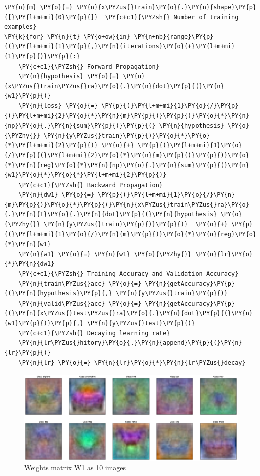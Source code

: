 \documentclass[a4paper,11pt]{article}%
\begin{document}
    \begin{tcolorbox}[breakable, size=fbox, boxrule=1pt, pad at break*=1mm,colback=cellbackground, colframe=cellborder]
\begin{Verbatim}[commandchars=\\\{\}]
\PY{n}{m} \PY{o}{=} \PY{n}{x\PYZus{}train}\PY{o}{.}\PY{n}{shape}\PY{p}{[}\PY{l+m+mi}{0}\PY{p}{]}  \PY{c+c1}{\PYZsh{} Number of training examples}
\PY{k}{for} \PY{n}{t} \PY{o+ow}{in} \PY{n+nb}{range}\PY{p}{(}\PY{l+m+mi}{1}\PY{p}{,}\PY{n}{iterations}\PY{o}{+}\PY{l+m+mi}{1}\PY{p}{)}\PY{p}{:}    
    \PY{c+c1}{\PYZsh{} Forward Propagation}
    \PY{n}{hypothesis} \PY{o}{=} \PY{n}{x\PYZus{}train\PYZus{}ra}\PY{o}{.}\PY{n}{dot}\PY{p}{(}\PY{n}{w1}\PY{p}{)}
    \PY{n}{loss} \PY{o}{=} \PY{p}{(}\PY{l+m+mi}{1}\PY{o}{/}\PY{p}{(}\PY{l+m+mi}{2}\PY{o}{*}\PY{n}{m}\PY{p}{)}\PY{p}{)}\PY{o}{*}\PY{n}{np}\PY{o}{.}\PY{n}{sum}\PY{p}{(}\PY{p}{(} \PY{n}{hypothesis} \PY{o}{\PYZhy{}} \PY{n}{y\PYZus{}train}\PY{p}{)}\PY{o}{*}\PY{o}{*}\PY{l+m+mi}{2}\PY{p}{)} \PY{o}{+} \PY{p}{(}\PY{l+m+mi}{1}\PY{o}{/}\PY{p}{(}\PY{l+m+mi}{2}\PY{o}{*}\PY{n}{m}\PY{p}{)}\PY{p}{)}\PY{o}{*}\PY{n}{reg}\PY{o}{*}\PY{n}{np}\PY{o}{.}\PY{n}{sum}\PY{p}{(}\PY{n}{w1}\PY{o}{*}\PY{o}{*}\PY{l+m+mi}{2}\PY{p}{)}   
    \PY{c+c1}{\PYZsh{} Backward Propagation}
    \PY{n}{dw1} \PY{o}{=} \PY{p}{(}\PY{l+m+mi}{1}\PY{o}{/}\PY{n}{m}\PY{p}{)}\PY{o}{*}\PY{p}{(}\PY{n}{x\PYZus{}train\PYZus{}ra}\PY{o}{.}\PY{n}{T}\PY{o}{.}\PY{n}{dot}\PY{p}{(}\PY{n}{hypothesis} \PY{o}{\PYZhy{}} \PY{n}{y\PYZus{}train}\PY{p}{)}\PY{p}{)}  \PY{o}{+} \PY{p}{(}\PY{l+m+mi}{1}\PY{o}{/}\PY{n}{m}\PY{p}{)}\PY{o}{*}\PY{n}{reg}\PY{o}{*}\PY{n}{w1} 
    \PY{n}{w1} \PY{o}{=} \PY{n}{w1} \PY{o}{\PYZhy{}} \PY{n}{lr}\PY{o}{*}\PY{n}{dw1}    
    \PY{c+c1}{\PYZsh{} Training Accuracy and Validation Accuracy}
    \PY{n}{train\PYZus{}acc} \PY{o}{=} \PY{n}{getAccuracy}\PY{p}{(}\PY{n}{hypothesis}\PY{p}{,} \PY{n}{y\PYZus{}train}\PY{p}{)}
    \PY{n}{valid\PYZus{}acc} \PY{o}{=} \PY{n}{getAccuracy}\PY{p}{(}\PY{n}{x\PYZus{}test\PYZus{}ra}\PY{o}{.}\PY{n}{dot}\PY{p}{(}\PY{n}{w1}\PY{p}{)}\PY{p}{,} \PY{n}{y\PYZus{}test}\PY{p}{)}
    \PY{c+c1}{\PYZsh{} Decaying learning rate}
    \PY{n}{lr\PYZus{}hitory}\PY{o}{.}\PY{n}{append}\PY{p}{(}\PY{n}{lr}\PY{p}{)}
    \PY{n}{lr} \PY{o}{=} \PY{n}{lr}\PY{o}{*}\PY{n}{lr\PYZus{}decay}
\end{Verbatim}
\end{tcolorbox}

\begin{figure}[!h]
	\centering
	\includegraphics[scale=0.3]{figures/trainedWeightslc}
	\caption{Weights matrix W1 as 10 images}
\end{figure}
\end{document}
